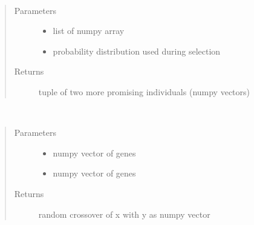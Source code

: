 \documentclass[letterpaper,10pt,english]{sphinxmanual}
\begin{document}
\begin{fulllineitems}

\begin{fulllineitems}
\label{\detokenize{index:genetic_optimizer.GeneticOptimizer.random_selection}}~\begin{quote}\begin{description}
\item[{Parameters}] \leavevmode\begin{itemize}
\item {} 
 \textendash{} list of numpy array

\item {} 
 \textendash{} probability distribution used during selection

\end{itemize}

\item[{Returns}] \leavevmode
tuple of two more promising individuals (numpy vectors)

\end{description}\end{quote}

\end{fulllineitems}


\begin{fulllineitems}
\label{\detokenize{index:genetic_optimizer.GeneticOptimizer.reproduce}}~\begin{quote}\begin{description}
\item[{Parameters}] \leavevmode\begin{itemize}
\item {} 
 \textendash{} numpy vector of genes

\item {} 
 \textendash{} numpy vector of genes

\end{itemize}

\item[{Returns}] \leavevmode
random crossover of x with y as numpy vector

\end{description}\end{quote}

\end{fulllineitems}


\end{fulllineitems}
\end{document}
